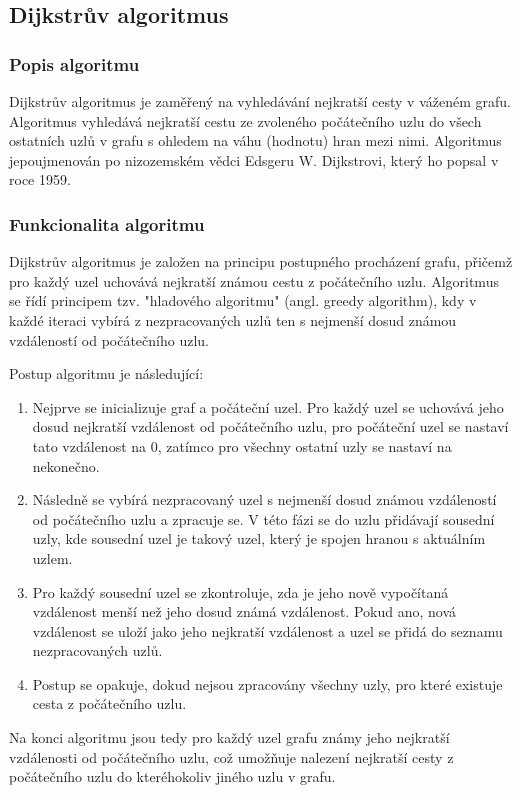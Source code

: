 \documentclass[12pt, titlepage, a4paper]{article}
\begin{document}
\subsection{Dijkstrův algoritmus}
\subsubsection{Popis algoritmu}
Dijkstrův algoritmus je zaměřený na vyhledávání nejkratší cesty v váženém grafu. Algoritmus 
vyhledává nejkratší cestu ze zvoleného počátečního uzlu do všech ostatních uzlů v grafu s 
ohledem na váhu (hodnotu) hran mezi nimi. Algoritmus jepoujmenován po nizozemském vědci 
Edsgeru W. Dijkstrovi, který ho popsal v roce 1959.

\subsubsection{Funkcionalita algoritmu}
Dijkstrův algoritmus je založen na principu postupného procházení grafu, přičemž pro každý 
uzel uchovává nejkratší známou cestu z počátečního uzlu. Algoritmus se řídí principem tzv. 
"hladového algoritmu" (angl. greedy algorithm), kdy v každé iteraci vybírá z nezpracovaných 
uzlů ten s nejmenší dosud známou vzdáleností od počátečního uzlu.

Postup algoritmu je následující:

\begin{enumerate}
    \item Nejprve se inicializuje graf a počáteční uzel. Pro každý uzel se uchovává jeho 
    dosud nejkratší vzdálenost od počátečního uzlu, pro počáteční uzel se nastaví tato 
    vzdálenost na 0, zatímco pro všechny ostatní uzly se nastaví na nekonečno.

    \item Následně se vybírá nezpracovaný uzel s nejmenší dosud známou vzdáleností od 
    počátečního uzlu a zpracuje se. V této fázi se do uzlu přidávají sousední uzly, kde 
    sousední uzel je takový uzel, který je spojen hranou s aktuálním uzlem.
    
    \item Pro každý sousední uzel se zkontroluje, zda je jeho nově vypočítaná vzdálenost 
    menší než jeho dosud známá vzdálenost. Pokud ano, nová vzdálenost se uloží jako jeho 
    nejkratší vzdálenost a uzel se přidá do seznamu nezpracovaných uzlů.
    
    \item Postup se opakuje, dokud nejsou zpracovány všechny uzly, pro které existuje 
    cesta z počátečního uzlu.
\end{enumerate}
Na konci algoritmu jsou tedy pro každý uzel grafu známy jeho nejkratší vzdálenosti od 
počátečního uzlu, což umožňuje nalezení nejkratší cesty z počátečního uzlu do kteréhokoliv 
jiného uzlu v grafu.
\end{document}
